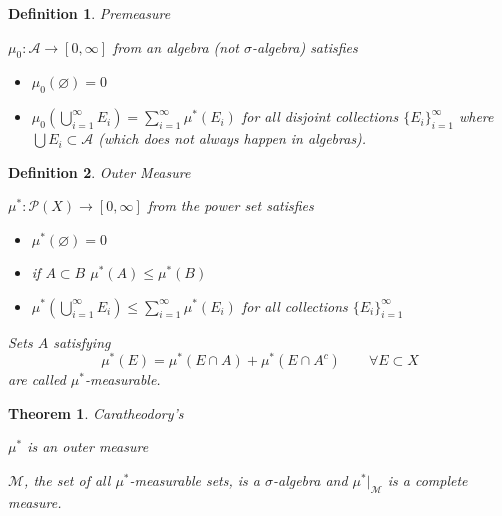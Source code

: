 \documentclass[12pt]{Qual}
\newtheorem{theorem}{Theorem}
\newtheorem{definition}{Definition}
\begin{document}
\vspace{0.5cm}
\begin{definition}{\Large\textit{Premeasure}}
$\,$

$\mu_0:\mathscr{A}\to[0,\infty]$ from an \textit{algebra} (not $\sigma$-algebra) satisfies
\begin{itemize}
\renewcommand\labelitemi{\faCoffee}
    \item $\mu_0(\varnothing)=0$
    \item $\displaystyle \mu_0\left(\bigcup_{i=1}^\infty E_i\right)=\sum_{i=1}^\infty\mu^*(E_i)$ for all disjoint collections $\{E_i\}_{i=1}^\infty$ where $\bigcup E_i\subset\mathscr{A}$ (which does not always happen in algebras).
\end{itemize}

\end{definition}
\vspace{0.5cm}
\begin{definition}{\Large\textit{Outer Measure}}
$\,$

$\mu^*:\mathscr{P}(X)\to[0,\infty]$ from the power set satisfies
\begin{itemize}
\setlength\itemsep{-0.1em}
\renewcommand\labelitemi{\faCoffee}
    \item $\mu^*(\varnothing)=0$
    \item if $A\subset B$ $\mu^*(A)\le\mu^*(B)$
    \item $\displaystyle \mu^*\left(\bigcup_{i=1}^\infty E_i\right)\le\sum_{i=1}^\infty\mu^*(E_i)$ for all collections $\{E_i\}_{i=1}^\infty$
\end{itemize}

Sets $A$ satisfying $$\mu^*(E)=\mu^*(E\cap A)+\mu^*(E\cap A^c)\qquad\forall E\subset X$$ are called $\mu^*$-measurable.

\end{definition}
\vspace{0.5cm}
\begin{theorem}{\Large\textit{Caratheodory's}}

 $\mu^*$ is an outer measure

 \begin{minipage}{0.85\textwidth}
\vspace{0.45cm}
$\mathscr{M}$, the set of all $\mu^*$-measurable sets, is a $\sigma$-algebra and $\mu^*|_\mathscr{M}$ is a complete measure.
\end{minipage}

\end{theorem}
\end{document}
